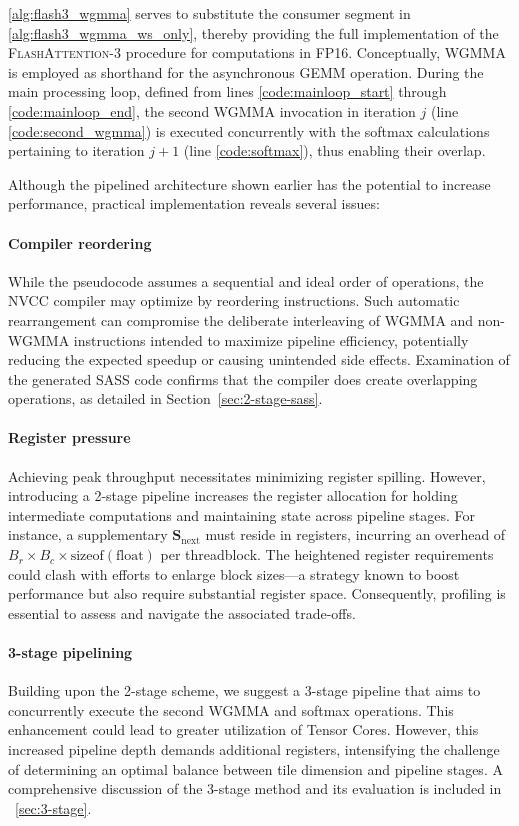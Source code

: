 \cref{alg:flash3_wgmma} serves to substitute the consumer segment in \cref{alg:flash3_wgmma_ws_only}, thereby providing the full implementation of the \textsc{FlashAttention-3} procedure for computations in FP16. Conceptually, WGMMA is employed as shorthand for the asynchronous GEMM operation. During the main processing loop, defined from lines \ref{code:mainloop_start} through \ref{code:mainloop_end}, the second WGMMA invocation in iteration $j$ (line \ref{code:second_wgmma}) is executed concurrently with the softmax calculations pertaining to iteration $j+1$ (line \ref{code:softmax}), thus enabling their overlap.

Although the pipelined architecture shown earlier has the potential to increase performance, practical implementation reveals several issues:

\paragraph{Compiler reordering} While the pseudocode assumes a sequential and ideal order of operations, the NVCC compiler may optimize by reordering instructions. Such automatic rearrangement can compromise the deliberate interleaving of WGMMA and non-WGMMA instructions intended to maximize pipeline efficiency, potentially reducing the expected speedup or causing unintended side effects. Examination of the generated SASS code confirms that the compiler does create overlapping operations, as detailed in Section~\ref{sec:2-stage-sass}.

\paragraph{Register pressure} Achieving peak throughput necessitates minimizing register spilling. However, introducing a 2-stage pipeline increases the register allocation for holding intermediate computations and maintaining state across pipeline stages. For instance, a supplementary $\mathbf{S}_{\mathrm{next}}$ must reside in registers, incurring an overhead of $B_r \times B_c \times \text{sizeof}(\text{float})$ per threadblock. The heightened register requirements could clash with efforts to enlarge block sizes—a strategy known to boost performance but also require substantial register space. Consequently, profiling is essential to assess and navigate the associated trade-offs.

\paragraph{3-stage pipelining} Building upon the 2-stage scheme, we suggest a 3-stage pipeline that aims to concurrently execute the second WGMMA and softmax operations. This enhancement could lead to greater utilization of Tensor Cores. However, this increased pipeline depth demands additional registers, intensifying the challenge of determining an optimal balance between tile dimension and pipeline stages. A comprehensive discussion of the 3-stage method and its evaluation is included in ~\cref{sec:3-stage}.

